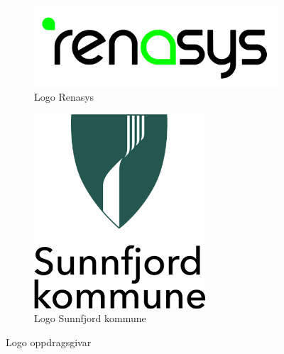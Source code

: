 \begin{figure}[htbp]
    \centering
    \begin{subfigure}[b]{0.3\textwidth}
        \centering
        \includegraphics[width=1\textwidth]{Bilder/renasys.png}
        \caption{Logo Renasys}\label{fig:subfig1}
    \end{subfigure}
    \hfill
    \begin{subfigure}[b]{0.3\textwidth}
        \centering
        \includegraphics[width=0.7\textwidth]{Bilder/SK.png}
        \caption{Logo Sunnfjord kommune}\label{fig:subfig2}
    \end{subfigure}
    \caption{Logo oppdragsgivar}\label{fig:Illustrasjon-Diffuser}
\end{figure}